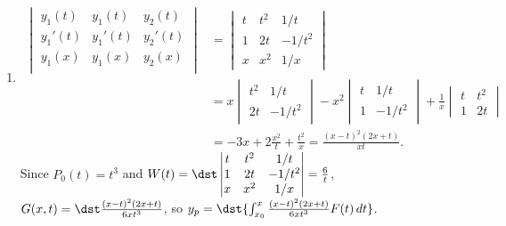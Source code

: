 \documentclass[openany]{book}
\newenvironment{sectionSolutions}{
 \begin{enumerate}[item-label={\thesection.\arabic{enumi}.}]
}{
 \end{enumerate}
}
\begin{document}
\begin{sectionSolutions}
\item
\begin{align*}
\begin{vmatrix}
y_1(t)&y_1(t)&y_2(t)\\
y_1'(t)&y_1'(t)&y_2'(t)\\
y_1(x)&y_1(x)&y_2(x)\\
\end{vmatrix} &=
\begin{vmatrix}
t&t^2&1/t\\
1&2t&-1/t^2\\
x&x^2&1/x
\end{vmatrix}\\
&=
x\begin{vmatrix}t^2&1/t\\2t&-1/t^2\end{vmatrix}
-x^2\begin{vmatrix}t&1/t\\1&-1/t^2\end{vmatrix}
+\frac{1}{ x}\begin{vmatrix}t&t^2\\1&2t\end{vmatrix}\\
&=-3x+2\frac{x^2}{ t}+\frac{t^2}{ x}=\frac{(x-t)^2(2x+t)}{ xt}.
\end{align*}
Since $P_0(t)=t^3$ and
$W(t)=\dst\begin{vmatrix}
t&t^2&1/t\\
1&2t&-1/t^2\\
x&x^2&1/x
\end{vmatrix}=\frac{6}{ t}$,
$G(x,t)=\dst\frac {(x-t)^2(2x+t)}{6xt^3}$,
so
$y_p=\dst{\int_{x_0}^x \frac{(x-t)^2(2x+t)}{6xt^3}
F(t)\,dt}$.



\end{sectionSolutions}
\end{document}
